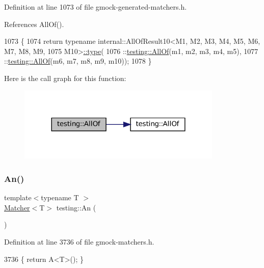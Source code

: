 Definition at line 1073 of file gmock-\/generated-\/matchers.\+h.



References All\+Of().


\begin{DoxyCode}
1073                                                                               \{
1074   \textcolor{keywordflow}{return} \textcolor{keyword}{typename} internal::AllOfResult10<M1, M2, M3, M4, M5, M6, M7, M8, M9,
1075       M10>\hyperlink{namespacegenerate__debs_a50bc9a7ecac9584553e089a448bcde58}{::type}(
1076       ::\hyperlink{namespacetesting_af7618e8606c1cb45738163688944e2b7}{testing::AllOf}(m1, m2, m3, m4, m5),
1077       ::\hyperlink{namespacetesting_af7618e8606c1cb45738163688944e2b7}{testing::AllOf}(m6, m7, m8, m9, m10));
1078 \}
\end{DoxyCode}
Here is the call graph for this function\+:
\nopagebreak
\begin{figure}[H]
\begin{center}
\leavevmode
\includegraphics[width=276pt]{namespacetesting_a9939c08664efeed0c1983090115f7ecb_cgraph}
\end{center}
\end{figure}
\mbox{\label{namespacetesting_a48792471ff9cdf5b4f95a4242df7bfbb}} 
\subsubsection{\texorpdfstring{An()}{An()}}
{\footnotesize\ttfamily template$<$typename T $>$ \\
\hyperlink{classtesting_1_1Matcher}{Matcher}$<$T$>$ testing\+::\+An (\begin{DoxyParamCaption}{ }\end{DoxyParamCaption})\hspace{0.3cm}{\ttfamily [inline]}}



Definition at line 3736 of file gmock-\/matchers.\+h.


\begin{DoxyCode}
3736 \{ \textcolor{keywordflow}{return} A<T>(); \}
\end{DoxyCode}
\mbox{\label{namespacetesting_aa1f8a6371097e1e9b8d6866020f35252}} 
